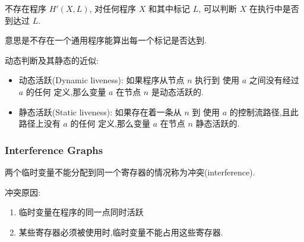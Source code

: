 \begin{corollary}
    不存在程序 $H'(X, L)$, 对任何程序 $X$ 和其中标记 $L$, 可以判断 $X$ 在执行中是否到达过 $L$.
\end{corollary}
意思是不存在一个通用程序能算出每一个标记是否达到. 


动态判断及其静态的近似:
\begin{itemize}
    \item 动态活跃(Dynamic liveness): 如果程序从节点 $n$ 执行到 使用 $a$ 之间没有经过 $a$ 的任何 定义,那么变量 $a$ 在节点 $n$ 是动态活跃的.
    \item 静态活跃(Static liveness): 如果存在着一条从 $n$ 到 使用 $a$ 的控制流路径,且此路径上没有 $a$ 的任何 定义,那么变量 $a$ 在节点 $n$ 静态活跃的.
\end{itemize}

\subsubsection{Interference Graphs}
\begin{definition}
    两个临时变量不能分配到同一个寄存器的情况称为冲突(interference).
\end{definition}

冲突原因:
\begin{enumerate}
    \item 临时变量在程序的同一点同时活跃
    \item 某些寄存器必须被使用时,临时变量不能占用这些寄存器.
\end{enumerate}


